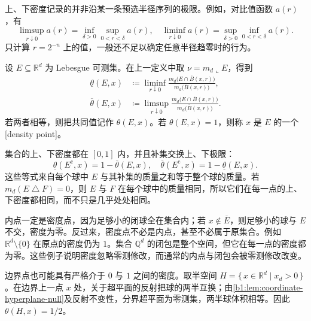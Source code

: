 上、下密度记录的并非沿某一条预选半径序列的极限。例如，对比值函数 \(a(r)\)，有
\[
\limsup_{r\downarrow0}a(r)
=\inf_{\delta>0}\sup_{0<r<\delta}a(r),
\quad
\liminf_{r\downarrow0}a(r)
=\sup_{\delta>0}\inf_{0<r<\delta}a(r).
\]
只计算 \(r=2^{-n}\) 上的值，一般还不足以确定任意半径趋零时的行为。

\begin{definition}
\label{b1:def:density-point}
设 \(E\subseteq\mathbb R^d\) 为 Lebesgue 可测集。在上一定义中取 \(\nu=m_d\llcorner E\)，得到
\[
\begin{aligned}
\underline\theta(E,x)
&\coloneqq\liminf_{r\downarrow0}
\frac{m_d\bigl(E\cap\overline B(x,r)\bigr)}{m_d\bigl(\overline B(x,r)\bigr)},\\
\overline\theta(E,x)
&\coloneqq\limsup_{r\downarrow0}
\frac{m_d\bigl(E\cap\overline B(x,r)\bigr)}{m_d\bigl(\overline B(x,r)\bigr)}.
\end{aligned}
\]
若两者相等，则把共同值记作 \(\theta(E,x)\)。若 \(\theta(E,x)=1\)，则称 \(x\) 是 \(E\) 的一个[density point]。
\end{definition}

集合的上、下密度都在 \([0,1]\) 内，并且补集交换上、下极限：
\[
\underline\theta(E^{\mathrm c},x)=1-\overline\theta(E,x),
\quad
\overline\theta(E^{\mathrm c},x)=1-\underline\theta(E,x).
\]
这些等式来自每个球中 \(E\) 与其补集的质量之和等于整个球的质量。若 \(m_d(E\mathbin{\triangle} F)=0\)，则 \(E\) 与 \(F\) 在每个球中的质量相同，所以它们在每一点的上、下密度都相同，而不只是几乎处处相同。

\ProseParagraphBreak

内点一定是密度点，因为足够小的闭球全在集合内；若 \(x\notin\overline E\)，则足够小的球与 \(E\) 不交，密度为零。反过来，密度点不必是内点，甚至不必属于原集合。例如 \(\mathbb R^d\setminus\{0\}\) 在原点的密度仍为 \(1\)。集合 \(\mathbb Q^d\) 的闭包是整个空间，但它在每一点的密度都为零。这些例子说明密度忽略零测修改，而通常的内点与闭包会被零测修改改变。

\ProseParagraphBreak

边界点也可能具有严格介于 \(0\) 与 \(1\) 之间的密度。取半空间 \(H=\{\,x\in\mathbb R^d\mid x_d>0\,\}\)。在边界上一点 \(x\) 处，关于超平面的反射把球的两半互换；由\cref{b1:lem:coordinate-hyperplane-null}及反射不变性，分界超平面为零测集，两半球体积相等。因此 \(\theta(H,x)=1/2\)。

\ProseParagraphBreak

